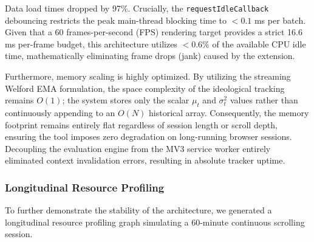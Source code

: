 \documentclass[10pt, conference, compsoc]{IEEEtran}
\begin{document}
\begin{table}[htbp]
\caption{Performance Profiling: Legacy IndexedDB vs. In-Memory Fetch}
\begin{center}
\label{tab:eval_metrics}
\end{center}
\end{table}

Data load times dropped by 97\%. Crucially, the \texttt{requestIdleCallback} debouncing restricts the peak main-thread blocking time to $<0.1$ ms per batch. Given that a 60 frames-per-second (FPS) rendering target provides a strict 16.6 ms per-frame budget, this architecture utilizes $<0.6\%$ of the available CPU idle time, mathematically eliminating frame drops (jank) caused by the extension. 

Furthermore, memory scaling is highly optimized. By utilizing the streaming Welford EMA formulation, the space complexity of the ideological tracking remains $O(1)$; the system stores only the scalar $\mu_t$ and $\sigma^2_t$ values rather than continuously appending to an $O(N)$ historical array. Consequently, the memory footprint remains entirely flat regardless of session length or scroll depth, ensuring the tool imposes zero degradation on long-running browser sessions. Decoupling the evaluation engine from the MV3 service worker entirely eliminated context invalidation errors, resulting in absolute tracker uptime.

\subsubsection{Longitudinal Resource Profiling}
To further demonstrate the stability of the architecture, we generated a longitudinal resource profiling graph simulating a 60-minute continuous scrolling session.
\end{document}
